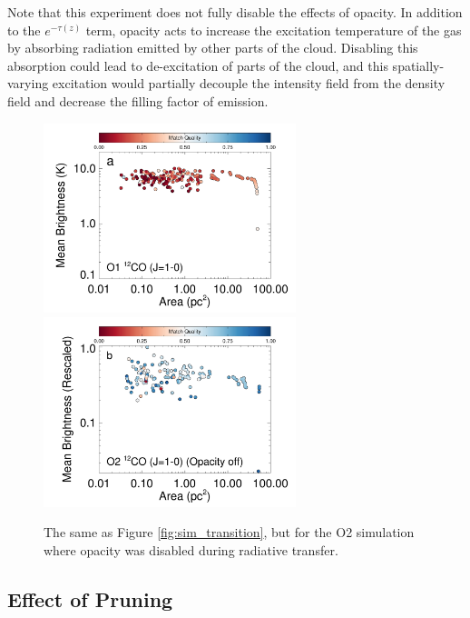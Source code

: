 Note that this experiment does not fully disable the effects of opacity. In addition to the $e^{-\tau(z)}$ term, opacity acts to increase the excitation temperature of the gas by absorbing radiation emitted by other parts of the cloud. Disabling this absorption could lead to de-excitation of parts of the cloud, and this spatially-varying excitation would partially decouple the intensity field from the density field and decrease the filling factor of emission.

\begin{figure}[htbp]
\centering
\includegraphics[width=2.9in]{figures/stella_dss_co10}
\includegraphics[width=2.9in]{figures/notau_dss_co10}
\caption{The same as Figure \ref{fig:sim_transition}, but for the O2 simulation where opacity
was disabled during radiative transfer.}
\label{fig:sim_notau}
\end{figure}

\subsection{Effect of Pruning}
\label{sec:pruning_test}

